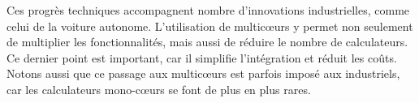 
Ces progrès techniques accompagnent nombre d'innovations industrielles, comme
celui de la voiture autonome. L'utilisation de multic\oe{}urs y permet non
seulement de multiplier les fonctionnalités, mais aussi de réduire le nombre de
calculateurs. Ce dernier point est important, car il simplifie l'intégration et
réduit les coûts. Notons aussi que ce passage aux multic\oe{}urs est parfois
imposé aux industriels, car les calculateurs mono-c\oe{}urs se font de plus en
plus rares.

